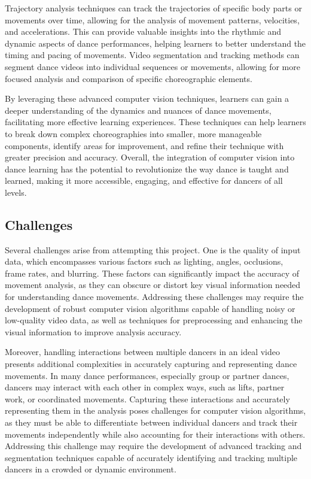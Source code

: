 Trajectory analysis techniques can track the trajectories of specific body parts or movements 
over time, allowing for the analysis of movement patterns, velocities, and accelerations. This 
can provide valuable insights into the rhythmic and dynamic aspects of dance performances, 
helping learners to better understand the timing and pacing of movements. Video segmentation and 
tracking methods can segment dance videos into individual sequences or movements, allowing for more 
focused analysis and comparison of specific choreographic elements.

By leveraging these advanced computer vision techniques, learners can gain a deeper understanding 
of the dynamics and nuances of dance movements, facilitating more effective learning experiences. 
These techniques can help learners to break down complex choreographies into smaller, more 
manageable components, identify areas for improvement, and refine their technique with greater 
precision and accuracy. Overall, the integration of computer vision into dance learning has the 
potential to revolutionize the way dance is taught and learned, making it more accessible, engaging, 
and effective for dancers of all levels.

\subsection{Challenges}
Several challenges arise from attempting this project. One is the quality of input data, which 
encompasses various factors such as lighting, angles, occlusions, frame rates, and blurring. These 
factors can significantly impact the accuracy of movement analysis, as they can obscure or distort 
key visual information needed for understanding dance movements. Addressing these challenges may 
require the development of robust computer vision algorithms capable of handling noisy or low-quality 
video data, as well as techniques for preprocessing and enhancing the visual information to improve 
analysis accuracy.

Moreover, handling interactions between multiple dancers in an ideal video presents additional 
complexities in accurately capturing and representing dance movements. In many dance performances, 
especially group or partner dances, dancers may interact with each other in complex ways, such as 
lifts, partner work, or coordinated movements. Capturing these interactions and accurately 
representing them in the analysis poses challenges for computer vision algorithms, as they must be 
able to differentiate between individual dancers and track their movements independently while also 
accounting for their interactions with others. Addressing this challenge may require the development 
of advanced tracking and segmentation techniques capable of accurately identifying and tracking 
multiple dancers in a crowded or dynamic environment.

